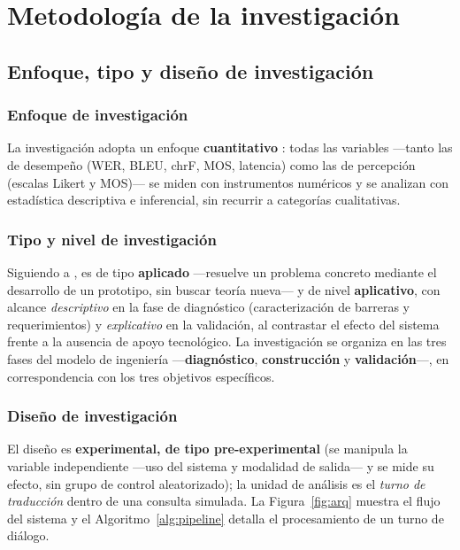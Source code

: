 \documentclass[12pt,a4paper]{article}
\newcommand{\nuevo}[1]{#1}
\begin{document}
\clearpage
\section{Metodolog{\'i}a de la investigaci{\'o}n}

\subsection{Enfoque, tipo y dise{\~n}o de investigaci{\'o}n}

\subsubsection{Enfoque de investigaci{\'o}n}
La investigaci{\'o}n adopta un enfoque \textbf{\nuevo{cuantitativo}} \nuevo{\parencite{hernandez2018metodologia}:
todas las variables ---tanto las de desempe{\~n}o (WER, BLEU, chrF, MOS, latencia) como las de
percepci{\'o}n (escalas Likert y MOS)--- se miden con instrumentos num{\'e}ricos y se analizan con
estad{\'i}stica descriptiva e inferencial, sin recurrir a categor{\'i}as cualitativas.}

\subsubsection{Tipo y nivel de investigaci{\'o}n}
\nuevo{Siguiendo a \textcite{hernandez2018metodologia}, es de tipo \textbf{aplicado} ---resuelve un
problema concreto mediante el desarrollo de un prototipo, sin buscar teor{\'i}a nueva--- y de nivel
\textbf{aplicativo}, con alcance \emph{descriptivo} en la fase de diagn{\'o}stico (caracterizaci{\'o}n
de barreras y requerimientos) y \emph{explicativo} en la validaci{\'o}n, al contrastar el efecto del
sistema frente a la ausencia de apoyo tecnol{\'o}gico. La investigaci{\'o}n se organiza en las tres
fases del modelo de ingenier{\'i}a ---\textbf{diagn{\'o}stico}, \textbf{construcci{\'o}n} y
\textbf{validaci{\'o}n}---, en correspondencia con los tres objetivos espec{\'i}ficos.}

\subsubsection{Dise{\~n}o de investigaci{\'o}n}
El dise{\~n}o es \textbf{\nuevo{experimental, de tipo pre-experimental}} \nuevo{(se manipula la
variable independiente ---uso del sistema y modalidad de salida--- y se mide su efecto, sin grupo de
control aleatorizado)}; la unidad de an{\'a}lisis es el \emph{turno de traducci{\'o}n} dentro de una
consulta simulada. La Figura~\ref{fig:arq} muestra el flujo del sistema y el
Algoritmo~\ref{alg:pipeline} detalla el procesamiento de un turno de di{\'a}logo.
\end{document}
